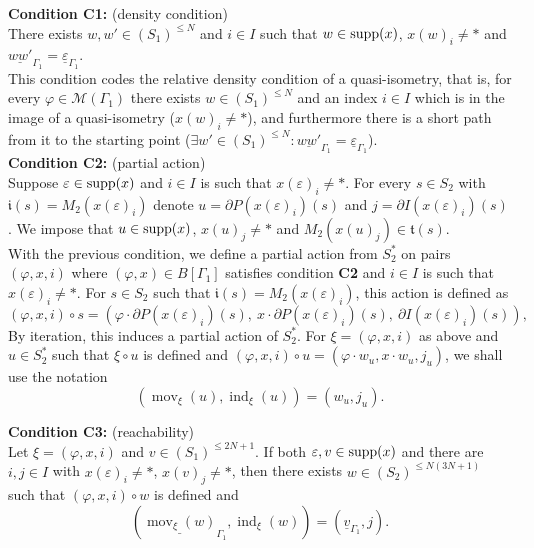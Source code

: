 \documentclass{article}
\theoremstyle{definition}
\theoremstyle{definition}
\newcommand{\init}{\mathfrak{i}}
\newcommand{\ter}{\mathfrak{t}}
\newcommand{\mov}{\operatorname{mov}}
\newcommand{\ind}{\operatorname{ind}}
\newcommand{\supp}{\textnormal{supp}}
\begin{document}
\noindent
\textbf{Condition C1:} (density condition) \\
There exists $w,w' \in (S_1)^{\leq N}$ and $i \in I$ such that $w\in \supp(x)$, $x(w)_i \neq \ast$ and $\underline{ww'}_{\Gamma_1}=\underline{\varepsilon}_{\Gamma_1}$.\\

This condition codes the relative density condition of a quasi-isometry, that is, for every $\varphi\in \mathcal{M}(\Gamma_1)$ there exists $w\in (S_1)^{\leq N}$ and an index $i \in I$ which is in the image of a quasi-isometry ($x(w)_i\neq \ast$), and furthermore there is a short path from it to the starting point ($\exists w'\in (S_1)^{\leq N}: \underline{ww'}_{\Gamma_1}=\underline{\varepsilon}_{\Gamma_1}$).\\

\noindent
\textbf{Condition C2:} (partial action)\\
Suppose $\varepsilon\in \supp(x)$ and $i \in I$ is such that $x(\varepsilon)_i \neq \ast$. For every $s \in S_2$ with $\init(s) = M_2(x(\varepsilon)_{i})$ denote $u = \partial P(x(\varepsilon)_{i})(s)$ and $j = \partial I(x(\varepsilon)_{i})(s)$. We impose that $u \in \supp(x)$, $x(u)_{j} \neq \ast$ and $M_2(x(u)_{j}) \in \ter(s)$.\\

With the previous condition, we define a partial action from $S_2^*$ on pairs $(\varphi, x, i)$ where $(\varphi, x)\in B[\Gamma_1]$ satisfies condition \textbf{C2} and $i\in I$ is such that $x(\varepsilon)_i\neq\ast$. For $s\in S_2$ such that $\init(s) = M_2(x(\varepsilon)_i)$, this action is defined as
$$(\varphi, x, i) \circ s = \left(\varphi\cdot \partial P(x(\varepsilon)_{i})(s),\ x\cdot \partial P(x(\varepsilon)_{i})(s),\ \partial I(x(\varepsilon)_{i})(s)\right),$$
By iteration, this induces a partial action of $S_2^*$. For ${\xi}=(\varphi, x,i)$ as above and $u \in S_2^*$ such that $\xi \circ u$ is defined and $(\varphi, x, i)\circ u = (\varphi\cdot w_u, x\cdot w_u, j_u)$, we shall use the notation \begin{equation}\label{eqn:movind}
    (\mov_{\xi}(u),\ind_{\xi}(u)) = (w_u,j_u).
\end{equation}

\noindent
\textbf{Condition C3:} (reachability) \\
Let $\xi=(\varphi,x,i)$ and $v\in (S_1)^{\leq 2N +1}$. If both $\varepsilon,v\in \supp(x)$ and there are $i, j\in I$ with $x(\varepsilon)_{i}\neq\ast$, $x(v)_{j}\neq\ast$, then there exists $w\in (S_2)^{\leq N(3N+1)}$ such that $(\varphi, x, i) \circ w$ is defined and 
\[ (\underline{\mov_{\xi}(w)}_{\Gamma_1},\ind_{\xi}(w)) = (\underline{v}_{\Gamma_1},j). \]
\end{document}
